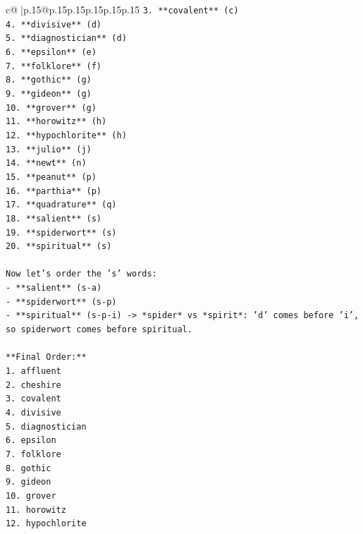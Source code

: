 \documentclass{article}
\begin{document}
{\begin{supertabular}{c@{$\;$}|p{.15\linewidth}@{}p{.15\linewidth}p{.15\linewidth}p{.15\linewidth}p{.15\linewidth}p{.15\linewidth}}
{{{\texttt{3.  **covalent** (c)} \\
\texttt{4.  **divisive** (d)} \\
\texttt{5.  **diagnostician** (d)} \\
\texttt{6.  **epsilon** (e)} \\
\texttt{7.  **folklore** (f)} \\
\texttt{8.  **gothic** (g)} \\
\texttt{9.  **gideon** (g)} \\
\texttt{10. **grover** (g)} \\
\texttt{11. **horowitz** (h)} \\
\texttt{12. **hypochlorite** (h)} \\
\texttt{13. **julio** (j)} \\
\texttt{14. **newt** (n)} \\
\texttt{15. **peanut** (p)} \\
\texttt{16. **parthia** (p)} \\
\texttt{17. **quadrature** (q)} \\
\texttt{18. **salient** (s)} \\
\texttt{19. **spiderwort** (s)} \\
\texttt{20. **spiritual** (s)} \\
\\ 
\texttt{Now let's order the 's' words:} \\
\texttt{{-}   **salient** (s{-}a)} \\
\texttt{{-}   **spiderwort** (s{-}p)} \\
\texttt{{-}   **spiritual** (s{-}p{-}i) {-}> *spider* vs *spirit*: 'd' comes before 'i', so spiderwort comes before spiritual.} \\
\\ 
\texttt{**Final Order:**} \\
\texttt{1.  affluent} \\
\texttt{2.  cheshire} \\
\texttt{3.  covalent} \\
\texttt{4.  divisive} \\
\texttt{5.  diagnostician} \\
\texttt{6.  epsilon} \\
\texttt{7.  folklore} \\
\texttt{8.  gothic} \\
\texttt{9.  gideon} \\
\texttt{10. grover} \\
\texttt{11. horowitz} \\
\texttt{12. hypochlorite} \\
}}}
\end{supertabular}}
\end{document}
